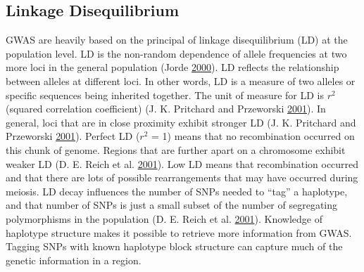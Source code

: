 \documentclass[]{DissertateOSU}
\begin{document}
\subsection{Linkage Disequilibrium}\label{linkage-disequilibrium}

GWAS are heavily based on the principal of linkage disequilibrium (LD)
at the population level. LD is the non-random dependence of allele
frequencies at two more loci in the general population (Jorde
\protect\hyperlink{ref-Jorde_2000}{2000}). LD reflects the relationship
between alleles at different loci. In other words, LD is a measure of
two alleles or specific sequences being inherited together. The unit of
measure for LD is \(r^{2}\) (squared correlation coefficient) (J. K.
Pritchard and Przeworski \protect\hyperlink{ref-Pritchard_2001}{2001}).
In general, loci that are in close proximity exhibit stronger LD (J. K.
Pritchard and Przeworski \protect\hyperlink{ref-Pritchard_2001}{2001}).
Perfect LD (\(r^{2}\) = 1) means that no recombination occurred on this
chunk of genome. Regions that are further apart on a chromosome exhibit
weaker LD (D. E. Reich et al. \protect\hyperlink{ref-Reich_2001}{2001}).
Low LD means that recombination occurred and that there are lots of
possible rearrangements that may have occurred during meiosis. LD decay
influences the number of SNPs needed to ``tag'' a haplotype, and that
number of SNPs is just a small subset of the number of segregating
polymorphisms in the population (D. E. Reich et al.
\protect\hyperlink{ref-Reich_2001}{2001}). Knowledge of haplotype
structure makes it possible to retrieve more information from GWAS.
Tagging SNPs with known haplotype block structure can capture much of
the genetic information in a region.
\end{document}
